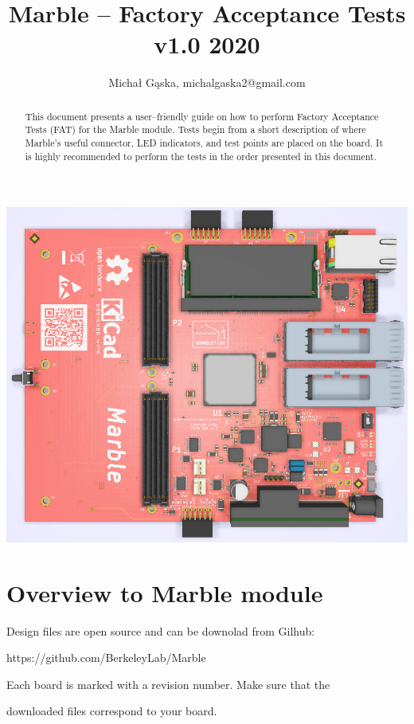 \documentclass[12pt,oneside,a4]{article}
\title{Marble -- Factory Acceptance Tests\\ \small{v1.0 2020}}
\author{Michał Gąska, michalgaska2@gmail.com}
\begin{document}
\maketitle
\begin{center}
\includegraphics[width=0.8\linewidth]{marble_top.png}
\end{center}
\begin{abstract}
This document presents a user--friendly guide on how to perform Factory Acceptance Tests (FAT) for the Marble module. Tests begin from a short description of where Marble's useful connector, LED indicators, and test points are placed on the board. It is highly recommended to perform the tests in the order presented in this document.
\end{abstract}

\clearpage
\tableofcontents

\clearpage

\section{Overview to Marble module}

\begin{leftbar}
Design files are open source and can be downolad from Gilhub:

https://github.com/BerkeleyLab/Marble
\end{leftbar}


\begin{leftbar}
Each board is marked with a revision number. Make sure that the

downloaded files correspond to your board.
\end{leftbar}
\end{document}
